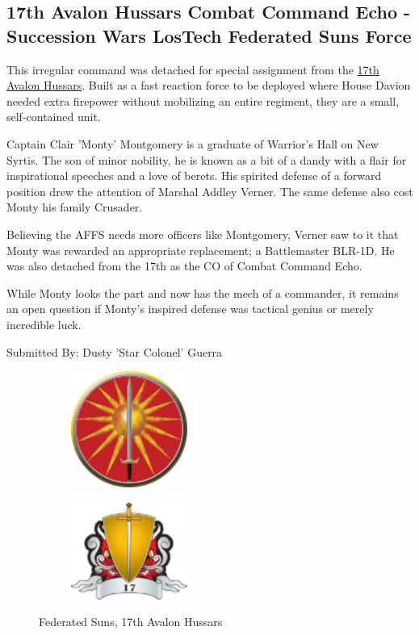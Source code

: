 \subsection{17th Avalon Hussars Combat Command Echo - Succession Wars LosTech Federated Suns Force}

This irregular command was detached for special assignment from the \href{https://www.sarna.net/wiki/17th_Avalon_Hussars}{17th Avalon Hussars}.
Built as a fast reaction force to be deployed where House Davion needed extra firepower without mobilizing an entire regiment, they are a small, self-contained unit.

Captain Clair 'Monty' Montgomery is a graduate of Warrior's Hall on New Syrtis.
The son of minor nobility, he is known as a bit of a dandy with a flair for inspirational speeches and a love of berets.
His spirited defense of a forward position drew the attention of Marshal Addley Verner.
The same defense also cost Monty his family Crusader.

Believing the AFFS needs more officers like Montgomery, Verner saw to it that Monty was rewarded an appropriate replacement; a Battlemaster BLR-1D.
He was also detached from the 17th as the CO of Combat Command Echo. 
 
While Monty looks the part and now has the mech of a commander, it remains an open question if Monty’s inspired defense was tactical genius or merely incredible luck.

Submitted By: Dusty 'Star Colonel' Guerra

\begin{figure}[!h]
  \begin{center}
  \begin{subfigure}{0.4\textwidth}
  \centering
  \includegraphics[alt='Federated Suns Logo', width=1.5in, height=1.5in]{img/Federated-Suns.png}
  \end{subfigure}
  \hspace{1in}
  \begin{subfigure}{0.4\textwidth}
  \centering
  \includegraphics[alt='17th Avalon Hussars Logo', width=1.5in, height=1.25in]{img/17-Avalon-Hussars.png}
  \end{subfigure}
  \caption*{Federated Suns, 17th Avalon Hussars}
  \end{center}
\end{figure}

